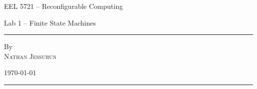 \hypersetup{pageanchor=false}
\begin{titlepage} %
  \centering %
  
  \vspace*{0.1\textheight}
  \large{EEL 5721 -- Reconfigurable Computing}\\
  \vspace{0.0025\textheight}
  
  \huge{Lab 1 -- Finite State Machines}
  \vspace{0.025\textheight} %
  
  \rule{0.3\textwidth}{0.4pt} %
  \vspace{0.1\textheight} %
  
  \small{By}\\
  \Large \textsc{Nathan Jessurun}\\%
  \vspace{0.04\textheight}
  
  \vspace{0.10\textheight}
  \normalsize{
    \today
  }
  \vfill %
  
  \rule{\textwidth}{0.4pt} %
\end{titlepage}
\hypersetup{pageanchor=true}